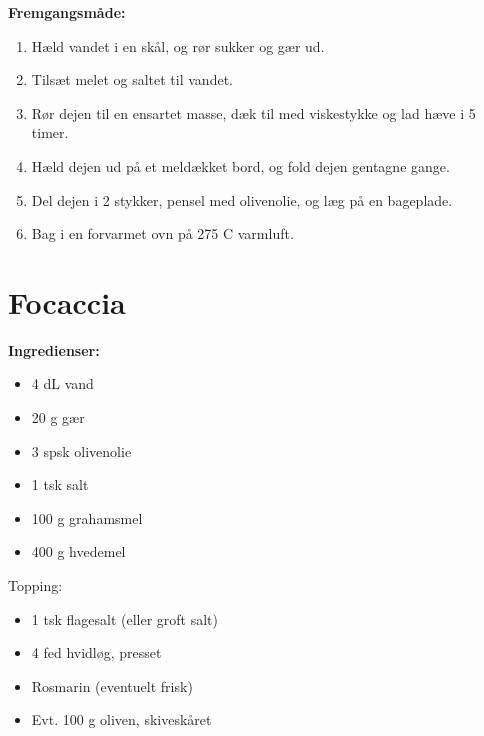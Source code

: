 \documentclass{book}
\begin{document}
\begin{minipage}[t]{0.5\textwidth}
\textbf{Fremgangsmåde:}
\begin{enumerate}
    \item Hæld vandet i en skål, og rør sukker og gær ud.
    \item Tilsæt melet og saltet til vandet.
    \item Rør dejen til en ensartet masse, dæk til med viskestykke og lad hæve i 5 timer.
    \item Hæld dejen ud på et meldækket bord, og fold dejen gentagne gange.
    \item Del dejen i 2 stykker, pensel med olivenolie, og læg på en bageplade.
    \item Bag i en forvarmet ovn på 275 \degree C varmluft.
\end{enumerate}
\end{minipage}
\newpage {}
\newpage \section{Focaccia}
\begin{minipage}[t]{0.5\textwidth}
\textbf{Ingredienser:}
\begin{itemize}
    \item 4 dL vand
    \item 20 g gær
    \item 3 spsk olivenolie
    \item 1 tsk salt
    \item 100 g grahamsmel
    \item 400 g hvedemel
\end{itemize}
Topping:
\begin{itemize}
    \item 1 tsk flagesalt (eller groft salt)
    \item 4 fed hvidløg, presset
    \item Rosmarin (eventuelt frisk)
    \item Evt. 100 g oliven, skiveskåret
    
\end{itemize}
\end{minipage}
\end{document}
